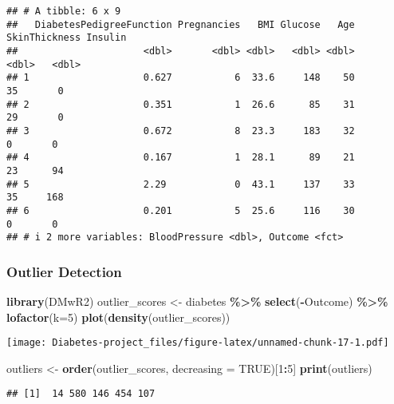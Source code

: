 \documentclass[
]{article}
\newenvironment{Shaded}{\begin{snugshade}}{\end{snugshade}}
\newcommand{\AttributeTok}[1]{\textcolor[rgb]{0.13,0.29,0.53}{#1}}
\newcommand{\ConstantTok}[1]{\textcolor[rgb]{0.56,0.35,0.01}{#1}}
\newcommand{\DecValTok}[1]{\textcolor[rgb]{0.00,0.00,0.81}{#1}}
\newcommand{\FunctionTok}[1]{\textcolor[rgb]{0.13,0.29,0.53}{\textbf{#1}}}
\newcommand{\NormalTok}[1]{#1}
\newcommand{\OtherTok}[1]{\textcolor[rgb]{0.56,0.35,0.01}{#1}}
\newcommand{\SpecialCharTok}[1]{\textcolor[rgb]{0.81,0.36,0.00}{\textbf{#1}}}
\begin{document}
\begin{verbatim}
## # A tibble: 6 x 9
##   DiabetesPedigreeFunction Pregnancies   BMI Glucose   Age SkinThickness Insulin
##                      <dbl>       <dbl> <dbl>   <dbl> <dbl>         <dbl>   <dbl>
## 1                    0.627           6  33.6     148    50            35       0
## 2                    0.351           1  26.6      85    31            29       0
## 3                    0.672           8  23.3     183    32             0       0
## 4                    0.167           1  28.1      89    21            23      94
## 5                    2.29            0  43.1     137    33            35     168
## 6                    0.201           5  25.6     116    30             0       0
## # i 2 more variables: BloodPressure <dbl>, Outcome <fct>
\end{verbatim}

\hypertarget{outlier-detection}{%
\subsubsection{Outlier Detection}\label{outlier-detection}}

\begin{Shaded}
\begin{Highlighting}[]
\FunctionTok{library}\NormalTok{(DMwR2)}
\NormalTok{outlier\_scores }\OtherTok{\textless{}{-}}\NormalTok{ diabetes }\SpecialCharTok{\%\textgreater{}\%} \FunctionTok{select}\NormalTok{(}\SpecialCharTok{{-}}\NormalTok{Outcome) }\SpecialCharTok{\%\textgreater{}\%} 
            \FunctionTok{lofactor}\NormalTok{(}\AttributeTok{k=}\DecValTok{5}\NormalTok{)}
\FunctionTok{plot}\NormalTok{(}\FunctionTok{density}\NormalTok{(outlier\_scores))}
\end{Highlighting}
\end{Shaded}

\texttt{[image: Diabetes-project\_files/figure-latex/unnamed-chunk-17-1.pdf]}

\begin{Shaded}
\begin{Highlighting}[]
\NormalTok{outliers }\OtherTok{\textless{}{-}} \FunctionTok{order}\NormalTok{(outlier\_scores, }
                  \AttributeTok{decreasing =} \ConstantTok{TRUE}\NormalTok{)[}\DecValTok{1}\SpecialCharTok{:}\DecValTok{5}\NormalTok{]}
\FunctionTok{print}\NormalTok{(outliers)}
\end{Highlighting}
\end{Shaded}

\begin{verbatim}
## [1]  14 580 146 454 107
\end{verbatim}
\end{document}
